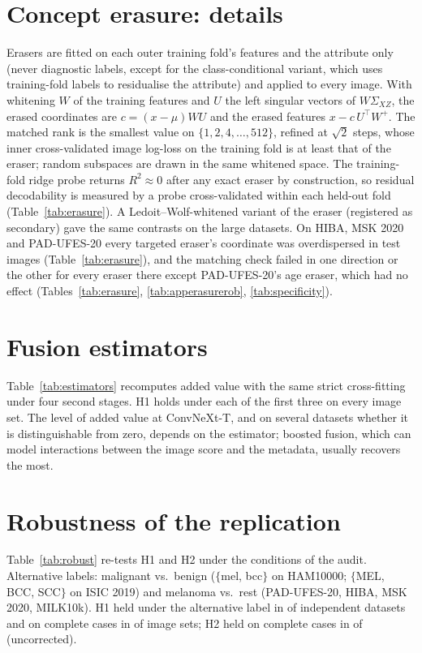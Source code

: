 \documentclass[conference]{IEEEtran}
\begin{document}
\section{Concept erasure: details}\label{app:erasure}



Erasers are fitted on each outer training fold's features and the attribute only (never diagnostic labels, except for the class-conditional variant, which uses training-fold labels to residualise the attribute) and applied to every image. With whitening $W$ of the training features and $U$ the left singular vectors of $W\Sigma_{XZ}$, the erased coordinates are $c=(x-\mu)WU$ and the erased features $x-c\,U^\top W^{+}$. The matched rank is the smallest value on $\{1,2,4,\dots,512\}$, refined at $\sqrt2$ steps, whose inner cross-validated image log-loss on the training fold is at least that of the eraser; random subspaces are drawn in the same whitened space. The training-fold ridge probe returns $R^2\approx0$ after any exact eraser by construction, so residual decodability is measured by a probe cross-validated within each held-out fold (Table~\ref{tab:erasure}). A Ledoit--Wolf-whitened variant of the eraser (registered as secondary) gave the same contrasts on the large datasets. On HIBA, MSK 2020 and PAD-UFES-20 every targeted eraser's coordinate was overdispersed in test images (Table~\ref{tab:erasure}), and the matching check failed in one direction or the other for every eraser there except PAD-UFES-20's age eraser, which had no effect (Tables~\ref{tab:erasure}, \ref{tab:apperasurerob}, \ref{tab:specificity}).

\section{Fusion estimators}\label{app:estimators}

Table~\ref{tab:estimators} recomputes added value with the same strict cross-fitting under four second stages. H1 holds under each of the first three on every image set. The level of added value at ConvNeXt-T, and on several datasets whether it is distinguishable from zero, depends on the estimator; boosted fusion, which can model interactions between the image score and the metadata, usually recovers the most.

\section{Robustness of the replication}\label{app:robust}

Table~\ref{tab:robust} re-tests H1 and H2 under the conditions of the audit. Alternative labels: malignant vs.\ benign ($\{$mel, bcc$\}$ on HAM10000; $\{$MEL, BCC, SCC$\}$ on ISIC 2019) and melanoma vs.\ rest (PAD-UFES-20, HIBA, MSK 2020, MILK10k). H1 held under the alternative label in \LABhOneHeld{} of \LABhOneN{} independent datasets and on complete cases in \CChOne{} of \CCn{} image sets; H2 held on complete cases in \CChTwo{} of \CCn{} (uncorrected).
\end{document}
